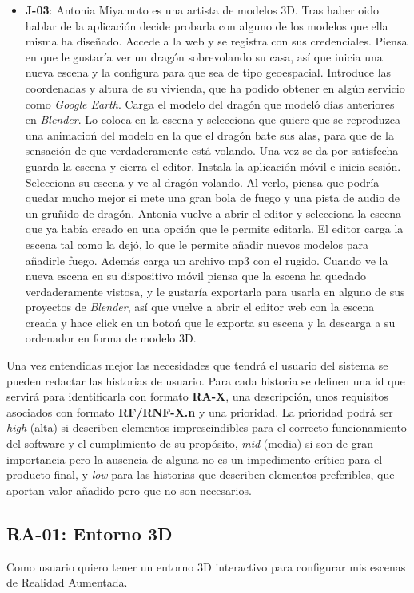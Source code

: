 \begin{itemize}
    \item \textbf{J-03}: Antonia Miyamoto es una artista de modelos 3D. Tras haber oido hablar de la aplicación decide probarla con alguno de los modelos que ella misma ha diseñado. Accede a la web y se registra con sus credenciales. Piensa en que le gustaría ver un dragón sobrevolando su casa, así que inicia una nueva escena y la configura para que sea de tipo geoespacial. Introduce las coordenadas y altura de su vivienda, que ha podido obtener en algún servicio como \textit{Google Earth}. Carga el modelo del dragón que modeló días anteriores en \textit{Blender}. Lo coloca en la escena y selecciona que quiere que se reproduzca una animacioń del modelo en la que el dragón bate sus alas, para que de la sensación de que verdaderamente está volando. Una vez se da por satisfecha guarda la escena y cierra el editor. Instala la aplicación móvil e inicia sesión. Selecciona su escena y ve al dragón volando. Al verlo, piensa que podría quedar mucho mejor si mete una gran bola de fuego y una pista de audio de un gruñido de dragón. Antonia vuelve a abrir el editor y selecciona la escena que ya había creado en una opción que le permite editarla. El editor carga la escena tal como la dejó, lo que le permite añadir nuevos modelos para añadirle fuego. Además carga un archivo mp3 con el rugido. Cuando ve la nueva escena en su dispositivo móvil piensa que la escena ha quedado verdaderamente vistosa, y le gustaría exportarla para usarla en alguno de sus proyectos de \textit{Blender}, así que vuelve a abrir el editor web con la escena creada y hace click en un botoń que le exporta su escena y la descarga a su ordenador en forma de modelo 3D.
\end{itemize}

Una vez entendidas mejor las necesidades que tendrá el usuario del sistema se pueden redactar las historias de usuario. Para cada historia se definen una id que servirá para identificarla con formato \textbf{RA-X}, una descripción, unos requisitos asociados con formato \textbf{RF/RNF-X.n} y una prioridad. La prioridad podrá ser \textit{high} (alta) si describen elementos imprescindibles para el correcto funcionamiento del software y el cumplimiento de su propósito, \textit{mid} (media) si son de gran importancia pero la ausencia de alguna no es un impedimento crítico para el producto final, y \textit{low} para las historias que describen elementos preferibles, que aportan valor añadido pero que no son necesarios.

\subsection{RA-01: Entorno 3D}
Como usuario quiero tener un entorno 3D interactivo para configurar mis escenas de Realidad Aumentada.

